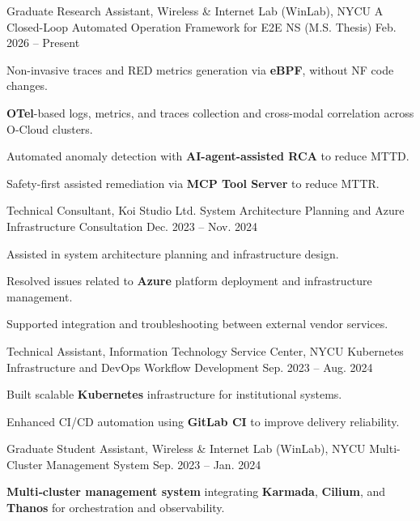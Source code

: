 \begin{cventries}
  \cventry
    {Graduate Research Assistant, Wireless \& Internet Lab (WinLab), NYCU} %
    {A Closed-Loop Automated Operation Framework for E2E NS (M.S. Thesis)} %
    {} %
    {Feb. 2026 -- Present} %
    {
      \begin{cvitems}
        \item {Non-invasive traces and RED metrics generation via \textbf{eBPF}, without NF code changes.}
        \item {\textbf{OTel}-based logs, metrics, and traces collection and cross-modal correlation across O-Cloud clusters.}
        \item {Automated anomaly detection with \textbf{AI-agent-assisted RCA} to reduce MTTD.}
        \item {Safety-first assisted remediation via \textbf{MCP Tool Server} to reduce MTTR.}
      \end{cvitems}
    }

  \cventry
    {Technical Consultant, Koi Studio Ltd.} %
    {System Architecture Planning and Azure Infrastructure Consultation} %
    {} %
    {Dec. 2023 -- Nov. 2024} %
    {
      \begin{cvitems}
        \item {Assisted in system architecture planning and infrastructure design.}
        \item {Resolved issues related to \textbf{Azure} platform deployment and infrastructure management.}
        \item {Supported integration and troubleshooting between external vendor services.}
      \end{cvitems}
    }

  \cventry
    {Technical Assistant, Information Technology Service Center, NYCU} %
    {Kubernetes Infrastructure and DevOps Workflow Development} %
    {} %
    {Sep. 2023 -- Aug. 2024} %
    {
      \begin{cvitems}
        \item {Built scalable \textbf{Kubernetes} infrastructure for institutional systems.}
        \item {Enhanced CI/CD automation using \textbf{GitLab CI} to improve delivery reliability.}
      \end{cvitems}
    }

  \cventry
    {Graduate Student Assistant, Wireless \& Internet Lab (WinLab), NYCU} %
    {Multi-Cluster Management System} %
    {} %
    {Sep. 2023 -- Jan. 2024} %
    {
      \begin{cvitems}
        \item {\textbf{Multi‑cluster management system} integrating \textbf{Karmada}, \textbf{Cilium}, and \textbf{Thanos} for orchestration and observability.}
      \end{cvitems}
    }

\end{cventries}
